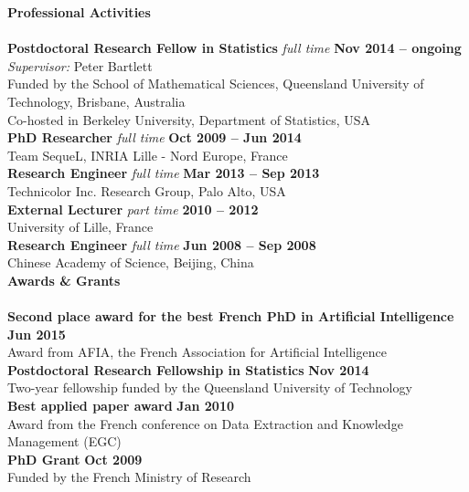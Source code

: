 \noindent\textbf{Professional Activities}\\[-.4cm]\noindent\makebox[\linewidth]{\rule{\columnwidth}{0.4pt}}\\[.1cm]
\noindent\textbf{Postdoctoral Research Fellow in Statistics} \textit{full time } \hfill \textbf{Nov 2014 -- ongoing} \\
\textit{Supervisor:} Peter Bartlett\\
Funded by the School of Mathematical Sciences, Queensland University of Technology, Brisbane, Australia\\
Co-hosted in Berkeley University, Department of Statistics, USA\\
\noindent\textbf{PhD Researcher} \textit{full time } \hfill \textbf{Oct 2009 -- Jun 2014}\\
Team SequeL, INRIA Lille - Nord Europe, France\\
\textbf{Research Engineer}  \textit{full time }  \hfill \textbf{ Mar 2013 -- Sep 2013}\\
Technicolor Inc. Research Group, Palo Alto, USA\\
\textbf{External Lecturer} \textit{part time }\hfill \textbf{2010 -- 2012  }\\
University of Lille, France\\ 
\textbf{Research Engineer}  \textit{full time }  \hfill \textbf{ Jun 2008 -- Sep 2008}\\
Chinese Academy of Science, Beijing, China\\[.2cm] 

\noindent\textbf{Awards \& Grants}\\[-.4cm]\noindent\makebox[\linewidth]{\rule{\columnwidth}{0.4pt}}\\[.1cm]
\noindent\textbf{Second place award for the best French PhD in Artificial Intelligence }  \hfill \textbf{Jun 2015}\\
Award from AFIA, the French Association for Artificial Intelligence\\
\noindent\textbf{Postdoctoral Research Fellowship in Statistics} \hfill \textbf{Nov 2014} \\
Two-year fellowship funded by the Queensland University of Technology\\
\textbf{Best applied paper award}  \hfill \textbf{ Jan 2010}\\
Award from the French conference on Data Extraction and Knowledge Management (EGC)\\
\textbf{PhD Grant}  \hfill \textbf{ Oct 2009}\\
Funded by the French Ministry of Research\\[.2cm]



